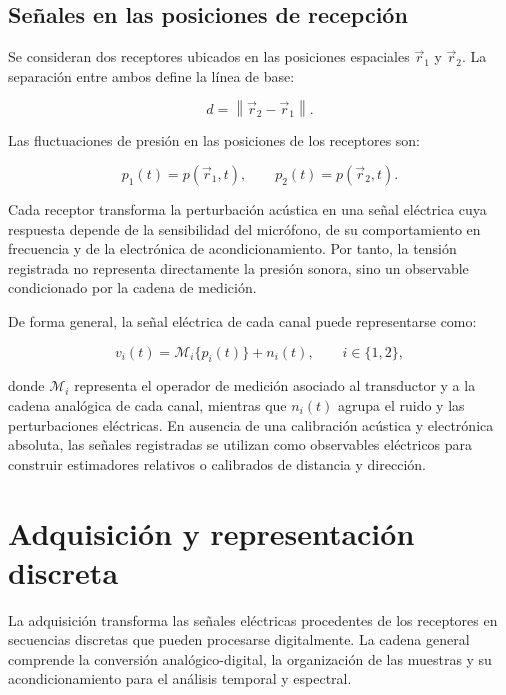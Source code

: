 \subsection*{Señales en las posiciones de recepción}

Se consideran dos receptores ubicados en las posiciones espaciales
$\vec{r}_1$ y $\vec{r}_2$. La separación entre ambos define la línea de
base:

\begin{equation}
    d
    =
    \left\|
        \vec{r}_2-\vec{r}_1
    \right\|.
    \label{eq:linea_base}
\end{equation}

Las fluctuaciones de presión en las posiciones de los receptores son:

\begin{equation}
    p_1(t)=p(\vec{r}_1,t),
    \qquad
    p_2(t)=p(\vec{r}_2,t).
    \label{eq:presion_receptores}
\end{equation}

Cada receptor transforma la perturbación acústica en una señal
eléctrica cuya respuesta depende de la sensibilidad del micrófono, de
su comportamiento en frecuencia y de la electrónica de
acondicionamiento. Por tanto, la tensión registrada no representa
directamente la presión sonora, sino un observable condicionado por la
cadena de medición.

De forma general, la señal eléctrica de cada canal puede representarse
como:

\begin{equation}
    v_i(t)
    =
    \mathcal{M}_i\{p_i(t)\}
    +
    n_i(t),
    \qquad i\in\{1,2\},
    \label{eq:transduccion}
\end{equation}

donde $\mathcal{M}_i$ representa el operador de medición asociado al
transductor y a la cadena analógica de cada canal, mientras que $n_i(t)$
agrupa el ruido y las perturbaciones eléctricas. En ausencia de una
calibración acústica y electrónica absoluta, las señales registradas se
utilizan como observables eléctricos para construir estimadores
relativos o calibrados de distancia y dirección.

\section{Adquisición y representación discreta}

La adquisición transforma las señales eléctricas procedentes de los
receptores en secuencias discretas que pueden procesarse digitalmente.
La cadena general comprende la conversión analógico-digital, la
organización de las muestras y su acondicionamiento para el análisis
temporal y espectral.

